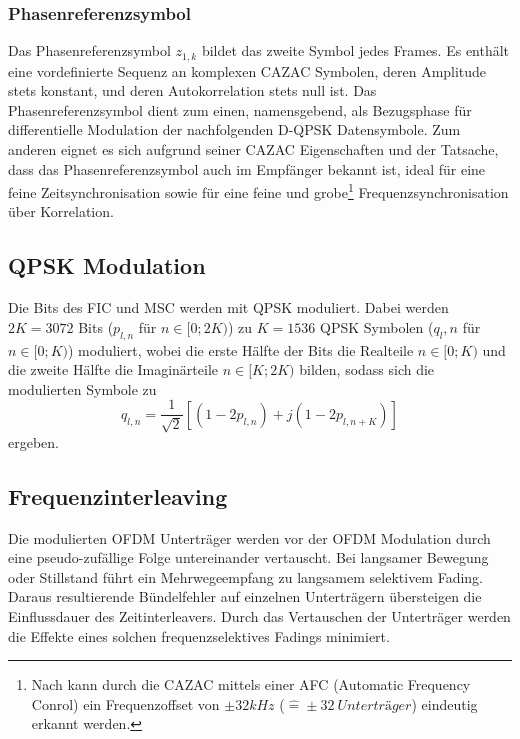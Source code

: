 \subsubsection{Phasenreferenzsymbol}
\label{sec:phasenreferenzsymbol}
Das Phasenreferenzsymbol $z_{1,k}$ bildet das zweite Symbol jedes Frames. Es enthält eine vordefinierte Sequenz an komplexen \ac{CAZAC} Symbolen, deren Amplitude stets konstant, und deren Autokorrelation stets null ist. Das Phasenreferenzsymbol dient zum einen, namensgebend, als Bezugsphase für differentielle Modulation der nachfolgenden D-QPSK Datensymbole. Zum anderen eignet es sich aufgrund seiner \ac{CAZAC} Eigenschaften und der Tatsache, dass das Phasenreferenzsymbol auch im Empfänger bekannt ist, ideal für eine feine Zeitsynchronisation sowie für eine feine und grobe\footnote{Nach \cite{dab_buch} kann durch die CAZAC mittels einer AFC (Automatic Frequency Conrol) ein Frequenzoffset von $\pm 32kHz$ ($\hat{=} \pm 32 \: Unterträger$) eindeutig erkannt werden.} Frequenzsynchronisation über Korrelation.

\subsection{QPSK Modulation}
Die Bits des FIC und MSC werden mit QPSK moduliert. Dabei werden $2K=3072$ Bits ($p_{l,n}$ für $n\in[0;2K)$) zu $K=1536$ QPSK Symbolen ($q_l,n$ für $n\in[0;K)$) moduliert, wobei die erste Hälfte der Bits die Realteile $n\in [0;K)$ und die zweite Hälfte die Imaginärteile $n\in [K;2K)$ bilden, sodass sich die modulierten Symbole zu
\begin{equation}
q_{l,n} = \frac{1}{\sqrt{2}}\left[\left(1-2p_{l,n}\right)+j\left(1-2p_{l,n+K}\right)\right]
\end{equation}
ergeben.

\subsection{Frequenzinterleaving}
Die modulierten OFDM Unterträger werden vor der OFDM Modulation durch eine pseudo-zufällige Folge untereinander vertauscht. Bei langsamer Bewegung oder Stillstand führt ein Mehrwegeempfang zu langsamem selektivem Fading. Daraus resultierende Bündelfehler auf einzelnen Unterträgern übersteigen die Einflussdauer des Zeitinterleavers. Durch das Vertauschen der Unterträger werden die Effekte eines solchen frequenzselektives Fadings minimiert. 


